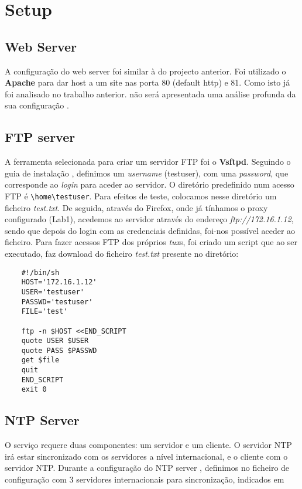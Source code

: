 \chapter{Setup}

\section{Web Server}

A configuração do web server foi similar à do projecto anterior. Foi utilizado o \textbf{Apache} para dar host a um site nas porta 80 (default http) e 81.
Como isto já foi analisado no trabalho anterior. não será apresentada uma análise profunda da sua configuração \cite{apache}.

\section{FTP server}

A ferramenta selecionada para criar um servidor FTP foi o \textbf{Vsftpd}. Seguindo o guia de instalação \cite{vsftpd},
definimos um \textit{username} (testuser), com uma \textit{password}, que corresponde ao \textit{login} para aceder ao servidor.
O diretório predefinido num acesso FTP é \verb|\home\testuser|. 
Para efeitos de teste, colocamos nesse diretório um ficheiro \textit{test.txt}. 
De seguida, através do Firefox, onde já tínhamos o proxy configurado (Lab1), acedemos ao servidor
através do endereço \textit{ftp://172.16.1.12}, sendo que depois do login com as credenciais definidas, foi-nos possível aceder ao ficheiro.
Para fazer acessos FTP dos próprios \textit{tux}s, foi criado um script que ao ser executado,
faz download do ficheiro \textit{test.txt} presente no diretório:
\begin{lstlisting}
    #!/bin/sh
    HOST='172.16.1.12'
    USER='testuser'
    PASSWD='testuser'
    FILE='test'

    ftp -n $HOST <<END_SCRIPT
    quote USER $USER
    quote PASS $PASSWD
    get $file
    quit
    END_SCRIPT
    exit 0
\end{lstlisting}

\section{NTP Server}

O serviço requere duas componentes: um servidor e um cliente. O servidor NTP irá estar sincronizado com os servidores a nível internacional, e o cliente com o servidor NTP.
Durante a configuração do NTP server \cite{ntp}, definimos no ficheiro de configuração com 3 servidores internacionais para sincronização, indicados em 

